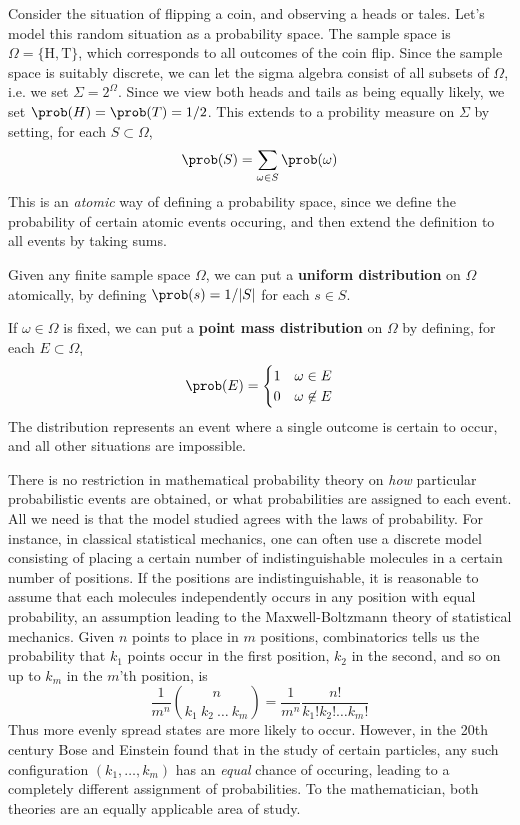 \begin{example}
    Consider the situation of flipping a coin, and observing a heads or tales. Let's model this random situation as a probability space. The sample space is $\Omega = \{ \text{H}, \text{T} \}$, which corresponds to all outcomes of the coin flip. Since the sample space is suitably discrete, we can let the sigma algebra consist of all subsets of $\Omega$, i.e. we set $\Sigma = 2^\Omega$. Since we view both heads and tails as being equally likely, we set $\prob(H) = \prob(T) = 1/2$. This extends to a probility measure on $\Sigma$ by setting, for each $S \subset \Omega$,
    \[ \prob(S) = \sum_{\omega \in S} \prob(\omega) \]
    This is an {\it atomic} way of defining a probability space, since we define the probability of certain atomic events occuring, and then extend the definition to all events by taking sums.
\end{example}

\begin{example}
    Given any finite sample space $\Omega$, we can put a {\bf uniform distribution} on $\Omega$ atomically, by defining $\prob(s) = 1/|S|$ for each $s \in S$.
\end{example}

\begin{example}
    If $\omega \in \Omega$ is fixed, we can put a {\bf point mass distribution} on $\Omega$ by defining, for each $E \subset \Omega$,
    \[ \prob(E) = \begin{cases} 1 & \omega \in E \\ 0 & \omega \not \in E \end{cases} \]
    The distribution represents an event where a single outcome is certain to occur, and all other situations are impossible.
\end{example}

There is no restriction in mathematical probability theory on {\it how} particular probabilistic events are obtained, or what probabilities are assigned to each event. All we need is that the model studied agrees with the laws of probability. For instance, in classical statistical mechanics, one can often use a discrete model consisting of placing a certain number of indistinguishable molecules in a certain number of positions. If the positions are indistinguishable, it is reasonable to assume that each molecules independently occurs in any position with equal probability, an assumption leading to the Maxwell-Boltzmann theory of statistical mechanics. Given $n$ points to place in $m$ positions, combinatorics tells us the probability that $k_1$ points occur in the first position, $k_2$ in the second, and so on up to $k_m$ in the $m$'th position, is
%
\[ \frac{1}{m^n} {n \choose k_1\ k_2\ \dots\ k_m} = \frac{1}{m^n} \frac{n!}{k_1! k_2! \dots k_m!} \]
%
Thus more evenly spread states are more likely to occur. However, in the 20th century Bose and Einstein found that in the study of certain particles, any such configuration $(k_1, \dots, k_m)$ has an {\it equal} chance of occuring, leading to a completely different assignment of probabilities. To the mathematician, both theories are an equally applicable area of study.

